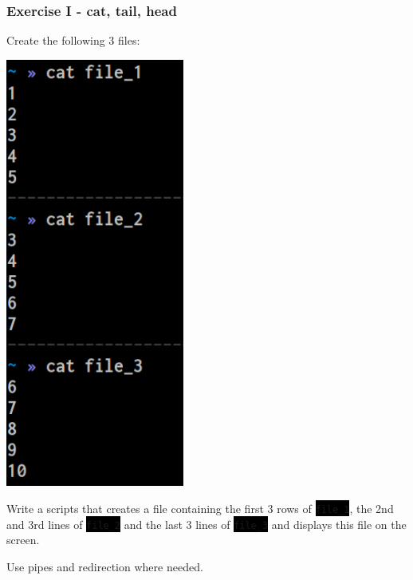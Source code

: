 \documentclass[unknownkeysallowed, 10pt, a4 paper, handout]{beamer}
\newcommand{\code}[1]{\colorbox{black}{\color{green}\texttt{#1}}}
\newcommand{\sidebyside}[5]{
  \begin{minipage}{#1\textwidth}
    #2
  \end{minipage} #3 \begin{minipage}{#4\textwidth}
    #5
  \end{minipage}
}
\begin{document}
\begin{frame}
\begin{center}
  \end{center}
\end{frame}

\begin{frame}
  \begin{center}
    \frametitle{Exercise I - cat, tail, head}

    \sidebyside{0.40}{
      Create the following 3 files:
    }{\hfill}{0.50}{
      \begin{center}
        \includegraphics[width=0.44\textwidth]{pics/ex_1.png}
      \end{center}
    }

    Write a scripts that creates a file containing the first 3 rows of
    \code{file\_1}, the 2nd and 3rd lines of \code{file\_2} and the last 3
    lines of \code{file\_3} and displays this file on the screen.

    Use pipes and redirection where needed.
  \end{center}
\end{frame}
\end{document}
